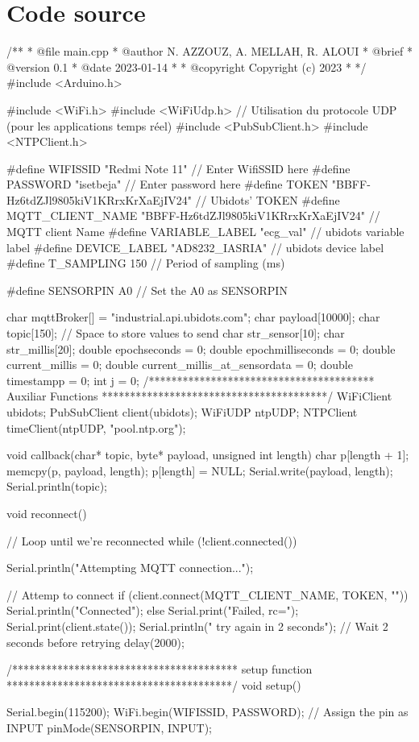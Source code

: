 \section{Code source\label{codesource}}
\begin{mycpp}
  /**
* @file main.cpp
* @author N. AZZOUZ, A. MELLAH, R. ALOUI
* @brief 
* @version 0.1
* @date 2023-01-14
* 
* @copyright Copyright (c) 2023
* 
*/
#include <Arduino.h>

#include <WiFi.h>
#include <WiFiUdp.h>  // Utilisation du protocole UDP (pour les applications temps réel)
#include <PubSubClient.h>
#include <NTPClient.h>


#define WIFISSID "Redmi Note 11" // Enter WifiSSID here
#define PASSWORD "isetbeja" // Enter password here
#define TOKEN "BBFF-Hz6tdZJl9805kiV1KRrxKrXaEjIV24" // Ubidots' TOKEN
#define MQTT_CLIENT_NAME "BBFF-Hz6tdZJl9805kiV1KRrxKrXaEjIV24" // MQTT client Name
#define VARIABLE_LABEL "ecg_val" // ubidots variable label
#define DEVICE_LABEL "AD8232_IASRIA" // ubidots device label
#define T_SAMPLING 150 // Period of sampling (ms)


#define SENSORPIN A0 // Set the A0 as SENSORPIN

char mqttBroker[]  = "industrial.api.ubidots.com";
char payload[10000];
char topic[150];
// Space to store values to send
char str_sensor[10];
char str_millis[20];
double epochseconds = 0;
double epochmilliseconds = 0;
double current_millis = 0;
double current_millis_at_sensordata = 0;
double timestampp = 0;
int j = 0;
/****************************************
 Auxiliar Functions
****************************************/
WiFiClient ubidots;
PubSubClient client(ubidots);
WiFiUDP ntpUDP;
NTPClient timeClient(ntpUDP, "pool.ntp.org");

void callback(char* topic, byte* payload, unsigned int length) {
char p[length + 1];
memcpy(p, payload, length);
p[length] = NULL;
Serial.write(payload, length);
Serial.println(topic);
}

void reconnect() {
// Loop until we're reconnected
while (!client.connected()) {
  Serial.println("Attempting MQTT connection...");

  // Attemp to connect
  if (client.connect(MQTT_CLIENT_NAME, TOKEN, "")) {
    Serial.println("Connected");
  } else {
    Serial.print("Failed, rc=");
    Serial.print(client.state());
    Serial.println(" try again in 2 seconds");
    // Wait 2 seconds before retrying
    delay(2000);
  }
}
}

/****************************************
 setup function
****************************************/
void setup() {
Serial.begin(115200);
WiFi.begin(WIFISSID, PASSWORD);
// Assign the pin as INPUT
pinMode(SENSORPIN, INPUT);

}
\end{mycpp}
